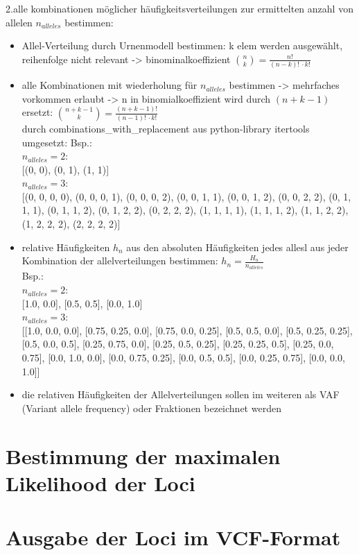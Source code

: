 \noindent 2.alle kombinationen möglicher häufigkeitsverteilungen zur ermittelten anzahl von allelen $ n_{alleles} $ bestimmen:\\
\begin{itemize}
	\item Allel-Verteilung durch Urnenmodell bestimmen: k elem werden ausgewählt, reihenfolge nicht relevant -> binominalkoeffizient $\binom{n}{k} = \frac{n!}{(n-k)!\, \cdotp k!}$ \\
	\item alle Kombinationen mit wiederholung für $n_{alleles} $ bestimmen -> mehrfaches vorkommen erlaubt -> n in binomialkoeffizient wird durch $(n + k -1)$ ersetzt: $\binom{n + k - 1}{k} = \frac{(n+k-1)!}{(n-1)!\, \cdotp k!}$\\ 
	durch combinations\_with\_replacement  aus python-library itertools umgesetzt:
	Bsp.: \\	
	$ n_{alleles} = 2$: \\
	{[(0, 0), (0, 1), (1, 1)]}\\
	$ n_{alleles} = 3$: \\
	{[(0, 0, 0, 0), (0, 0, 0, 1), (0, 0, 0, 2), (0, 0, 1, 1), (0, 0, 1, 2), (0, 0, 2, 2), (0, 1, 1, 1), (0, 1, 1, 2), (0, 1, 2, 2), (0, 2, 2, 2), (1, 1, 1, 1), (1, 1, 1, 2), (1, 1, 2, 2), (1, 2, 2, 2), (2, 2, 2, 2)]}\\
		
	\item relative Häufigkeiten $ h_{n} $  aus den absoluten Häufigkeiten jedes allesl aus jeder Kombination der allelverteilungen bestimmen:  $ h_{n} = \frac{H_{n}} {n_{alleles}} $\\
	Bsp.: \\
	$ n_{alleles} = 2$: \\
	{[1.0, 0.0]}, {[0.5, 0.5]}, {[0.0, 1.0]} \\
	$ n_{alleles} = 3$: \\
	{[{[1.0, 0.0, 0.0]}, {[0.75, 0.25, 0.0]}, {[0.75, 0.0, 0.25]}, {[0.5, 0.5, 0.0]}, {[0.5, 0.25, 0.25]}, {[0.5, 0.0, 0.5]},
		{[0.25, 0.75, 0.0]}, {[0.25, 0.5, 0.25]}, {[0.25, 0.25, 0.5]}, {[0.25, 0.0, 0.75]}, {[0.0, 1.0, 0.0]}, {[0.0, 0.75, 0.25]}, {[0.0, 0.5, 0.5]}, {[0.0, 0.25, 0.75]}, {[0.0, 0.0, 1.0]}]} \\
	\item die relativen Häufigkeiten der Allelverteilungen sollen im weiteren als VAF (Variant allele frequency) oder Fraktionen bezeichnet werden
\end{itemize}





\section{Bestimmung der maximalen Likelihood der Loci} \label{sec:lh_loci}
\subsection{} \label{subsec:}


\section{Ausgabe der Loci im VCF-Format} \label{sec:vcf}
\subsection{} \label{subsec:}
